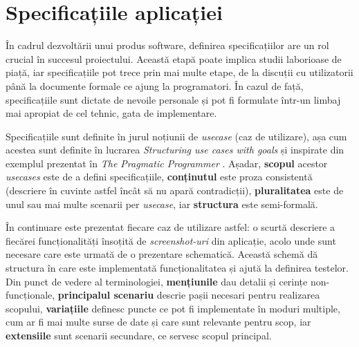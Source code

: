\chapter{Specificațiile aplicației}\label{specs}

În cadrul dezvoltării unui produs software, definirea specificațiilor are un rol crucial în succesul proiectului. Această etapă poate implica studii laborioase de piață, iar specificațiile pot trece prin mai multe etape, de la discuții cu utilizatorii până la documente formale ce ajung la programatori. În cazul de față, specificațiile sunt dictate de nevoile personale și pot fi formulate într-un limbaj mai apropiat de cel tehnic, gata de implementare.

Specificațiile sunt definite în jurul noțiunii de \emph{usecase} (caz de utilizare), așa cum acestea sunt definite în lucrarea \emph{Structuring use cases with goals} \cite{cockburn1997structuring} și inspirate din exemplul prezentat în \emph{The Pragmatic Programmer} \cite{Hunt:2000:PPJ:320326}. Așadar, \textbf{scopul} acestor \emph{usecases} este de a defini specificațiile, \textbf{conținutul} este proza consistentă (descriere în cuvinte astfel încât să nu apară contradicții), \textbf{pluralitatea} este de unul sau mai multe scenarii per \emph{usecase}, iar \textbf{structura} este semi-formală.

În continuare este prezentat fiecare caz de utilizare astfel: o scurtă descriere a fiecărei funcționalități însoțită de \emph{screenshot-uri} din aplicație, acolo unde sunt necesare care este urmată de o prezentare schematică. Această schemă dă structura în care este implementată funcționalitatea și ajută la definirea testelor. Din punct de vedere al terminologiei, \textbf{mențiunile} dau detalii și cerințe non-funcționale, \textbf{principalul scenariu} descrie pașii necesari pentru realizarea scopului, \textbf{variațiile} definesc puncte ce pot fi implementate în moduri multiple, cum ar fi mai multe surse de date și care sunt relevante pentru scop, iar \textbf{extensiile} sunt scenarii secundare, ce servesc scopul principal.







